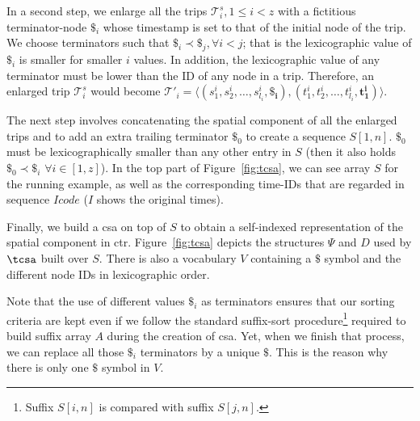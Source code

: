 	In a second step, we enlarge all the trips $\mathcal{T}^s_i, 1\!\leq\!i\!<\!z$ with a fictitious terminator-node $\$_i$ whose
	timestamp is set to that of the initial node of the trip. We choose terminators such that $\$_i \prec \$_j, \forall i<j$; 
	that is the lexicographic value of $\$_i$ is smaller for smaller $i$ values. In addition, the lexicographic value
	of any terminator must be lower than the ID of any node in a trip. Therefore, an enlarged trip $\mathcal{T}^s_i$
	would become $\mathcal{T}'_i =  \langle (s^i_1, s^i_2, \dots,  s^i_{l_i}, 
	\mathbf{\$_i}),(t^i_1, t^i_2, \dots,  t^i_{l_i}, \mathbf{t^i_1}) \rangle$. 

	The next step involves concatenating the spatial component of all the enlarged trips and to add an 
	extra trailing terminator $\$_0$ to create a sequence $S[1,n]$. $\$_0$ must be  lexicographically 
	smaller than any other entry in $S$ (then it also holds $\$_0 \prec \$_i$ $\forall i \in [1,z]$). In the top part of
	Figure~\ref{fig:tcsa}, we can see array $S$ for the running example, as well as the corresponding time-IDs that
	are regarded in sequence $Icode$  ($I$ shows the original times).

	Finally, we build a \gls{csa} on top of $S$ to obtain a self-indexed representation of the spatial component in \gls{ctr}.
	Figure~\ref{fig:tcsa} depicts the structures $\Psi$ and $D$ used by $\tcsa$ built over $S$. There is also a vocabulary
	$V$ containing a $\$$ symbol and the different node IDs in lexicographic order.

	Note that the use of different values $\$_i$ as terminators ensures that our sorting criteria are kept even if we follow the
	standard suffix-sort procedure\footnote{Suffix $S[i,n]$ is compared with suffix $S[j,n]$.} 
	required to build suffix array $A$ during the creation of \gls{csa}. Yet, when we finish that
	process, we can replace all those $\$_i$ terminators  by a unique $\$$. This is the reason why 
	there is only one $\$$ symbol in $V$. 
	 


